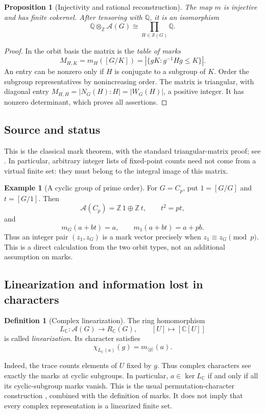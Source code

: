 \documentclass[11pt,a4paper]{article}
\newcommand{\defn}[1]{\textsl{\color{darkblue} #1}}
\numberwithin{equation}{section}
\newtheorem{proposition}[theorem]{Proposition}
\theoremstyle{definition}
\newtheorem{definition}[theorem]{Definition}
\newtheorem{example}[theorem]{Example}
\theoremstyle{remark}
\newcommand{\Z}{\mathbb Z}
\newcommand{\Q}{\mathbb Q}
\newcommand{\C}{\mathbb C}
\newcommand{\G}{G}
\newcommand{\RC}{R_{\C}}
\newcommand{\Burn}{\mathcal A}
\newcommand{\source}{\subsection*{\color{darkblue}Source and status}}
\begin{document}
\begin{proposition}[Injectivity and rational reconstruction]
\label{prop:marks}
The map $m$ is injective and has finite cokernel.  After tensoring
with $\Q$, it is an isomorphism
\[
 \Q\otimes_\Z\Burn(\G)\cong
       \prod_{H\in\mathscr S(\G)}\Q.
\]
\end{proposition}
\begin{proof}
In the orbit basis the matrix is the \defn{table of marks}
\begin{equation}\label{eq:table-marks}
 M_{H,K}=m_H([\G/K])
 =|\{gK:g^{-1}Hg\leq K\}|.
\end{equation}
An entry can be nonzero only if $H$ is conjugate to a subgroup of $K$.
Order the subgroup representatives by nonincreasing order.  The
matrix is triangular, with diagonal entry
$M_{H,H}=|N_\G(H):H|=|W_\G(H)|$, a positive integer.  It has
nonzero determinant, which proves all assertions.
\end{proof}
\source This is the classical mark theorem, with the standard
triangular-matrix proof; see \cite[\S3.2]{Bouc}.  In particular,
arbitrary integer lists of fixed-point counts need not come from a
virtual finite set: they must belong to the integral image of this
matrix.

\begin{example}[A cyclic group of prime order]\label{ex:cp-marks}
For $\G=C_p$, put $1=[\G/\G]$ and $t=[\G/1]$.
Then
\[
 \Burn(C_p)=\Z\,1\oplus\Z\,t,\qquad t^2=pt,
\]
and
\[
 m_\G(a+bt)=a,\qquad m_1(a+bt)=a+pb.
\]
Thus an integer pair $(z_1,z_\G)$ is a mark vector precisely when
$z_1\equiv z_\G\pmod p$.  This is a direct calculation from the
two orbit types, not an additional assumption on marks.
\end{example}

\subsection{Linearization and information lost in characters}

\begin{definition}[Complex linearization]
The ring homomorphism
\[
 L_\C:\Burn(\G)\longrightarrow\RC(\G),\qquad
 [U]\longmapsto[\C[U]]
\]
is called \defn{linearization}.  Its character satisfies
\begin{equation}\label{eq:linearization-marks}
 \chi_{L_\C(a)}(g)=m_{\langle g\rangle}(a).
\end{equation}
\end{definition}
Indeed, the trace counts elements of $U$ fixed by $g$.  Thus complex
characters see exactly the marks at cyclic subgroups.  In
particular, $a\in\ker L_\C$ if and only if all its cyclic-subgroup
marks vanish.  This is the usual permutation-character construction
\cite[Ch.~1]{Serre}, combined with the definition of marks.  It
does not imply that every complex representation is a linearized
finite set.
\end{document}

